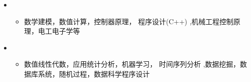   \begin{itemize}[leftmargin=*]

    \item
      {\small
      \begin{itemize}
        \item{数学建模，数值计算，控制器原理， 程序设计(C++) ,机械工程控制原理，电工电子学等}
      \end{itemize}
      }
      \item
      {\small
      \begin{itemize}
        \item{数值线性代数，应用统计分析，机器学习， 时间序列分析 ,数据挖掘，数据库系统，随机过程，数据科学程序设计}
      \end{itemize}
      }
      
      
      
  \end{itemize} 